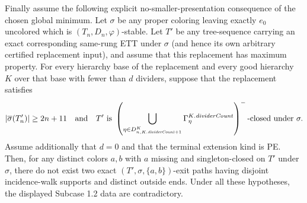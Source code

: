\begin{lemma}
Finally assume the following explicit no-smaller-presentation consequence
of the chosen global minimum.  Let $\sigma$ be any proper coloring leaving
exactly $e_0$ uncolored which is $(T_n,D_n,\varphi)$-stable.  Let $T'$ be
any tree-sequence carrying an exact corresponding same-rung ETT under
$\sigma$ (and hence its own arbitrary certified replacement input), and
assume that this replacement has maximum property.  For every hierarchy
base of the replacement and every good hierarchy $K$ over that base with
fewer than $d$ dividers, suppose that the replacement satisfies
\[
 |\overline\sigma(T'_n)|\geq2n+11
 \quad\hbox{and}\quad
 T'\text{ is }
 \left(\bigcup_{\eta\in D^K_{n,K.\mathit{dividerCount}+1}}
   \Gamma^{K.\mathit{dividerCount}}_\eta\right)^-
 \text{-closed under }\sigma .
\]
Assume additionally that $d=0$ and that the terminal extension kind is
PE.  Then, for any distinct colors $a,b$ with $a$ missing and singleton-closed
on $T'$ under $\sigma$, there do not exist two exact
$(T',\sigma,\{a,b\})$-exit paths having disjoint incidence-walk supports
and distinct outside ends.  Under all these hypotheses, the displayed
Subcase 1.2 data are contradictory.
\end{lemma}
